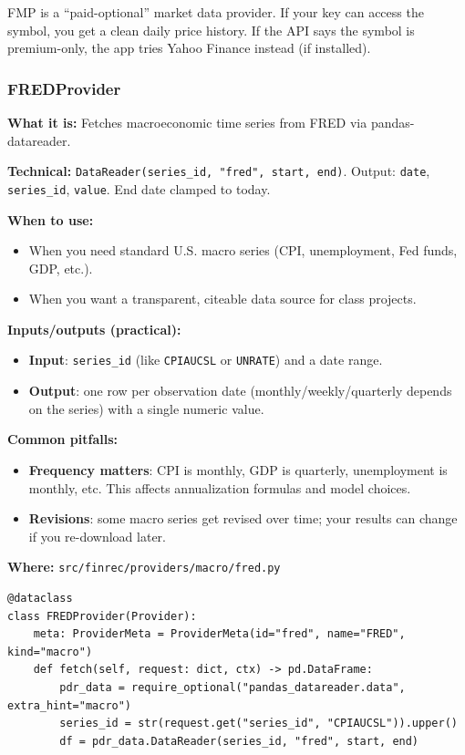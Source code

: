\documentclass[11pt,a4paper]{article}
\begin{document}
\begin{intuitionbox}
FMP is a ``paid-optional'' market data provider. If your key can access the symbol, you get a clean daily price history. If the API says the symbol is premium-only, the app tries Yahoo Finance instead (if installed).
\end{intuitionbox}

\subsubsection{FREDProvider}\label{sec:fred}

\textbf{What it is:} Fetches macroeconomic time series from FRED via pandas-datareader.

\textbf{Technical:} \texttt{DataReader(series\_id, "fred", start, end)}. Output: \texttt{date}, \texttt{series\_id}, \texttt{value}. End date clamped to today.

\textbf{When to use:}
\begin{itemize}[leftmargin=2em]
  \item When you need standard U.S. macro series (CPI, unemployment, Fed funds, GDP, etc.).
  \item When you want a transparent, citeable data source for class projects.
\end{itemize}

\textbf{Inputs/outputs (practical):}
\begin{itemize}[leftmargin=2em]
  \item \textbf{Input}: \texttt{series\_id} (like \texttt{CPIAUCSL} or \texttt{UNRATE}) and a date range.
  \item \textbf{Output}: one row per observation date (monthly/weekly/quarterly depends on the series) with a single numeric value.
\end{itemize}

\textbf{Common pitfalls:}
\begin{itemize}[leftmargin=2em]
  \item \textbf{Frequency matters}: CPI is monthly, GDP is quarterly, unemployment is monthly, etc. This affects annualization formulas and model choices.
  \item \textbf{Revisions}: some macro series get revised over time; your results can change if you re-download later.
\end{itemize}

\textbf{Where:} \texttt{src/finrec/providers/macro/fred.py}

\begin{lstlisting}
@dataclass
class FREDProvider(Provider):
    meta: ProviderMeta = ProviderMeta(id="fred", name="FRED", kind="macro")
    def fetch(self, request: dict, ctx) -> pd.DataFrame:
        pdr_data = require_optional("pandas_datareader.data", extra_hint="macro")
        series_id = str(request.get("series_id", "CPIAUCSL")).upper()
        df = pdr_data.DataReader(series_id, "fred", start, end)
\end{lstlisting}
\end{document}
